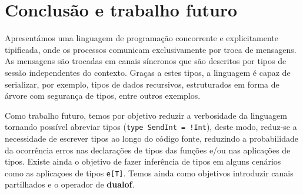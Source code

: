 \section{Conclusão e trabalho futuro}
\lstset{language=CFST, style=eclipse}
Apresentámos uma linguagem de programação concorrente e explicitamente tipificada, onde os processos comunicam exclusivamente por troca de mensagens. As mensagens são trocadas em canais síncronos que são descritos por tipos de sessão independentes do contexto. Graças a estes tipos, a linguagem é capaz de serializar, por exemplo, tipos de dados recursivos, estruturados em forma de árvore com segurança de tipos, entre outros exemplos.

Como trabalho futuro, temos por objetivo reduzir a verbosidade da linguagem tornando possível abreviar tipos (\lstinline{type SendInt = !Int}), deste modo, reduz-se a necessidade de escrever tipos ao longo do código fonte, reduzindo a probabilidade da ocorrência erros nas declarações de tipos das funções e/ou nas aplicações de tipos. Existe ainda o objetivo de fazer inferência de tipos em alguns cenários como as aplicaçoes de tipos \lstinline|e[T]|. Temos ainda como objetivos introduzir canais partilhados e o operador de \textbf{dualof}.
 
